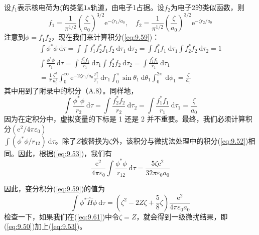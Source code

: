     设$f_1$表示核电荷为$\zeta$的类氢$1s$轨道，由电子1占据。设$f_2$为电子2的类似函数，则
    \begin{equation}
        f_1 = \frac{1}{\pi^{1/2}}\left(\frac{\zeta}{a_0}\right)^{3/2} \mathrm{e}^{-\zeta r_1/a_0}, \quad f_2 = \frac{1}{\pi^{1/2}}\left(\frac{\zeta}{a_0}\right)^{3/2} \mathrm{e}^{-\zeta r_2/a_0}
        \label{eq:9.60}
    \end{equation}
    注意到$\phi = f_1 f_2$，现在我们来计算积分(\ref{eq:9.59})：
    \begin{equation*}
        \begin{aligned}
            \int \phi^* \phi \: \mathrm{d}\tau = \int \int f_1^* f_2^* f_1 f_2 \: \mathrm{d}\tau_1 \: \mathrm{d}\tau_2 = \int f_1^* f_1 \: \mathrm{d}\tau_1 \int f_2^* f_2 \: \mathrm{d}\tau_2 = 1 \\
            \int \frac{\phi^* \phi}{r_1} \: \mathrm{d}\tau = \int \frac{f_1^*f_1}{r_1} \: \mathrm{d}\tau_1 \int f_2^* f_2 \: \mathrm{d}\tau_2 = \int \frac{f_1^* f_1}{r_1} \: \mathrm{d}\tau_1 \\
            = \frac{1}{\pi}\frac{\zeta^3}{a_0^3}\int_{0}^{\infty} \mathrm{e}^{-2\zeta r_1/a_0} \frac{r_1^2}{r_1} \:\mathrm{d}r_1 \int_{0}^{\pi} \sin\theta_1 \:\mathrm{d}\theta_1 \int_{0}^{2\pi} \:\mathrm{d}\phi_1 = \frac{\zeta}{a_0}
        \end{aligned}
    \end{equation*}
    其中用到了附录中的积分（A.8）。同样地，
    \begin{equation*}
        \int \frac{\phi^* \phi}{r_2} \: \mathrm{d}\tau = \int \frac{f_2^*f_2}{r_2}\: \mathrm{d}\tau_2 = \int \frac{f_1^*f_1}{r_1} \: \mathrm{d}\tau_1 = \frac{\zeta}{a_0}
    \end{equation*}
    因为在定积分中，虚拟变量的下标是 1 还是 2 并不重要。最终，我们必须计算积分$\left(\mathrm{e}^2 / 4\pi\varepsilon_0\right)$\\$ \int \left(\phi^* \phi / r_{12}\right) \: \mathrm{d}\tau$。除了$Z$被替换为$\zeta$外，该积分与微扰法处理中的积分(\ref{eq:9.52})相同。因此，根据(\ref{eq:9.53})，我们有
    \begin{equation*}
        \frac{\mathrm{e}^2}{4\pi\varepsilon_0}\int \frac{\phi^* \phi}{r_{12}} \: \mathrm{d}\tau = \frac{5\zeta\mathrm{e}^2}{32\pi\varepsilon_0a_0}
    \end{equation*}

    因此，变分积分(\ref{eq:9.59})的值为
    \begin{equation}
        \int \phi^* \hat{H} \phi \: \mathrm{d}\tau = \left(\zeta^2 - 2Z\zeta + \frac{5}{8}\zeta\right)\frac{\mathrm{e}^2}{4\pi\varepsilon_0a_0}
        \label{eq:9.61}
    \end{equation}
    检查一下，如果我们在(\ref{eq:9.61})中令$\zeta = Z$，就会得到一级微扰结果，即(\ref{eq:9.50})加上(\ref{eq:9.53})。

